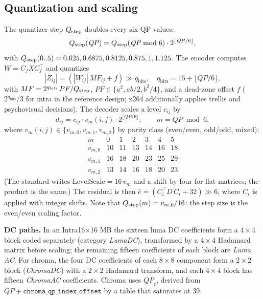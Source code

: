 \subsection{Quantization and scaling}
The quantizer step $Q_{\mathrm{step}}$ doubles every six QP values:
\begin{equation}
Q_{\mathrm{step}}(\mathit{QP})=Q_{\mathrm{step}}(\mathit{QP}\bmod6)\cdot2^{\lfloor \mathit{QP}/6\rfloor},
\label{eq:qstep}
\end{equation}
with $Q_{\mathrm{step}}(0..5)=0.625, 0.6875, 0.8125, 0.875, 1, 1.125$. The encoder computes $W=C_fXC_f^{\top}$ and quantizes
\begin{equation}
|Z_{ij}|=\left(|W_{ij}|\,MF_{ij}+f\right)\gg q_{\mathrm{bits}},\quad q_{\mathrm{bits}}=15+\lfloor \mathit{QP}/6\rfloor,
\label{eq:quant}
\end{equation}
with $MF=2^{q_{\mathrm{bits}}}\,PF/Q_{\mathrm{step}}$, $PF\in\{a^2,ab/2,b^2/4\}$, and a dead-zone offset $f$ ($2^{q_{\mathrm{bits}}}/3$ for intra in the reference design; x264 additionally applies trellis and psychovisual decisions). The decoder scales a level $c_{ij}$ by
\begin{equation}
d_{ij}=c_{ij}\cdot v_{m}(i,j)\cdot2^{\lfloor \mathit{QP}/6\rfloor},\qquad m=\mathit{QP}\bmod6,
\label{eq:dequant}
\end{equation}
where $v_m(i,j)\in\{v_{m,0},v_{m,1},v_{m,2}\}$ by parity class (even/even, odd/odd, mixed):
\begin{equation}
\begin{array}{c|cccccc}
m & 0 & 1 & 2 & 3 & 4 & 5\\\hline
v_{m,0} & 10 & 11 & 13 & 14 & 16 & 18\\
v_{m,1} & 16 & 18 & 20 & 23 & 25 & 29\\
v_{m,2} & 13 & 14 & 16 & 18 & 20 & 23
\end{array}
\label{eq:vtable}
\end{equation}
(The standard writes $\mathrm{LevelScale}=16\,v_m$ and a shift by four for flat matrices; the product is the same.) The residual is then $\hat e=(C_i^{\top}D\,C_i+32)\gg6$, where $C_i$ is applied with integer shifts. Note that $Q_{\mathrm{step}}(m)=v_{m,0}/16$: the step size is the even/even scaling factor.

\textbf{DC paths.} In an Intra16$\times$16 MB the sixteen luma DC coefficients form a $4\times4$ block coded separately (category \emph{LumaDC}), transformed by a $4\times4$ Hadamard matrix before scaling; the remaining fifteen coefficients of each block are \emph{Luma AC}. For chroma, the four DC coefficients of each $8\times8$ component form a $2\times2$ block (\emph{ChromaDC}) with a $2\times2$ Hadamard transform, and each $4\times4$ block has fifteen \emph{ChromaAC} coefficients. Chroma uses $\mathit{QP}_c$, derived from $\mathit{QP}+\texttt{chroma\_qp\_index\_offset}$ by a table that saturates at 39.


